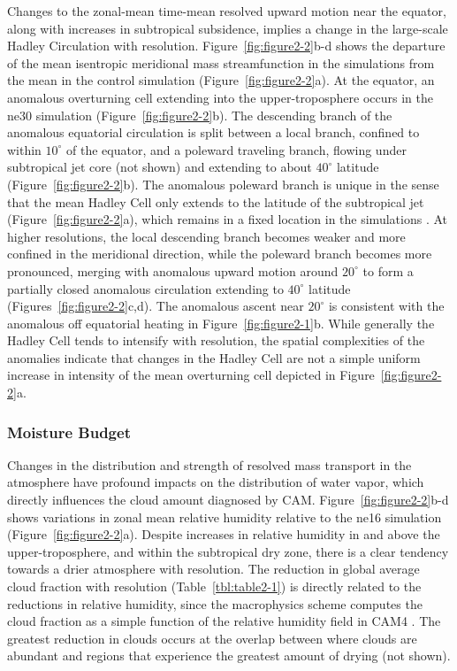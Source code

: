 Changes to the zonal-mean time-mean resolved upward motion near the equator, along with increases in subtropical subsidence, implies a change in the large-scale Hadley Circulation with resolution. Figure~\ref{fig:figure2-2}b-d shows the departure of the mean isentropic meridional mass streamfunction in the simulations from the mean in the control simulation (Figure~\ref{fig:figure2-2}a). At the equator, an anomalous overturning cell extending into the upper-troposphere occurs in the ne30 simulation (Figure~\ref{fig:figure2-2}b). The descending branch of the anomalous equatorial circulation is split between a local branch, confined to within $10^{\circ}$ of the equator, and a poleward traveling branch, flowing under subtropical jet core (not shown) and extending to about $40^{\circ}$ latitude (Figure~\ref{fig:figure2-2}b). The anomalous poleward branch is unique in the sense that the mean Hadley Cell only extends to the latitude of the subtropical jet (Figure~\ref{fig:figure2-2}a), which remains in a fixed location in the simulations \citep{LETAL2015JCLIM}. At higher resolutions, the local descending branch becomes weaker and more confined in the meridional direction, while the poleward branch becomes more pronounced, merging with anomalous upward motion around $20^{\circ}$ to form a partially closed anomalous circulation extending to $40^{\circ}$ latitude (Figures~\ref{fig:figure2-2}c,d). The anomalous ascent near $20^{\circ}$ is consistent with the anomalous off equatorial heating in Figure~\ref{fig:figure2-1}b. While generally the Hadley Cell tends to intensify with resolution, the spatial complexities of the anomalies indicate that changes in the Hadley Cell are not a simple uniform increase in intensity of the mean overturning cell depicted in Figure~\ref{fig:figure2-2}a.

\subsubsection{Moisture Budget}
Changes in the distribution and strength of resolved mass transport in the atmosphere have profound impacts on the distribution of water vapor, which directly influences the cloud amount diagnosed by CAM. Figure~\ref{fig:figure2-2}b-d shows variations in zonal mean relative humidity relative to the ne16 simulation (Figure~\ref{fig:figure2-2}a). Despite increases in relative humidity in and above the upper-troposphere, and within the subtropical dry zone, there is a clear tendency towards a drier atmosphere with resolution. The reduction in global average cloud fraction with resolution (Table~\ref{tbl:table2-1}) is directly related to the reductions in relative humidity, since the macrophysics scheme computes the cloud fraction as a simple function of the relative humidity field in CAM4 \citep{CAM4,PETAL2014JCLIM}. The greatest reduction in clouds occurs at the overlap between where clouds are abundant and regions that experience the greatest amount of drying (not shown).

